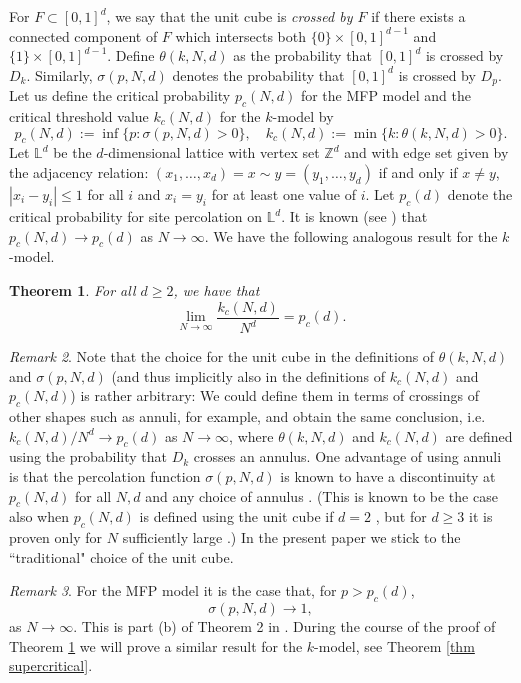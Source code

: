 \documentclass[11pt,a4paper]{article}
\newcommand{\IL}{\ensuremath{\mathbb{L}}}
\newcommand{\pc}{\ensuremath{p_{c}(d)}}
\newtheorem{theorem}{Theorem}[section]
\theoremstyle{remark}
\newtheorem{remark}[theorem]{Remark}
\begin{document}
For $F\subset [0,1]^d$, we say that the unit cube is \emph{crossed by $F$} if there exists a connected component of $F$ which intersects both $\{0\} \times [0,1]^{d-1}$ and $\{1\} \times [0,1]^{d-1}$. Define $\theta(k,N,d)$ as the probability that $[0,1]^d$ is crossed by $D_k$. Similarly, $\sigma(p,N,d)$ denotes the probability that $[0,1]^d$ is crossed by $D_{p}$. Let us define the critical probability $p_c(N,d)$ for the MFP model and the critical threshold value $k_c(N,d)$ for the $k$-model by
\[
 p_c(N,d) := \inf\{ p: \sigma(p,N,d) >0\}, \quad k_{c}(N,d) := \min \{k: \theta(k,N,d)>0\}.
\]
Let ${\mathbb L}^d$ be the $d$-dimensional lattice with
vertex set ${\mathbb Z}^d$ and with edge set given by the adjacency
relation: $(x_1, \ldots, x_d)=x \sim y=(y_1, \ldots, y_d)$
if and only if $x \neq y$, $|x_i-y_i| \leq 1$ for all $i$
and $x_i=y_i$ for at least one value of $i$. Let $p_c(d)$ denote the critical probability for site percolation on 
$\IL^d$. It is known (see \cite{FalGri}) that $p_{c}(N,d) \to p_c(d)$ as $N \to \infty$. We have the following analogous result for the $k$-model.


\begin{theorem}\label{thm critical k}
For all $d \geq 2$, we have that
 \[
 \lim_{N \to \infty} \frac{k_{c}(N,d)}{N^{d}} = p_{c}(d). 
 \]
\end{theorem}


\begin{remark} Note that the choice for the unit cube in the definitions of $\theta(k,N,d)$ and $\sigma(p,N,d)$ (and thus implicitly also in the definitions of $k_c(N,d)$ and $p_c(N,d)$) is rather arbitrary: We could define them in terms of crossings of other shapes such as annuli, for example, and obtain the same conclusion, i.e.\ $k_c(N,d)/N^d \to \pc$ as $N \to \infty$, where $\theta(k,N,d)$ and $k_c(N,d)$ are defined using the probability that $D_k$ crosses an annulus. One advantage of using annuli is that the percolation function $\sigma(p,N,d)$ is known to have a discontinuity at $p_c(N,d)$ for all $N,d$ and any choice of annulus \cite[Corollary 2.6]{BroCam}. (This is known to be the case also when $p_c(N,d)$ is defined using the unit cube if $d=2$ \cite{ChaChaDur, DekMee}, but for $d\geq 3$ it is proven only for $N$ sufficiently large \cite{BroCam08}.) In the present paper we stick to the ``traditional" choice of the unit cube.
\end{remark}


\begin{remark}\label{remark supercritical MFP}
For the MFP model it is the case  that, for $p>\pc$,
\begin{equation}\label{prob to 1}
\sigma(p,N,d) \to 1,  
\end{equation}
as $N \to \infty$. This is part (b) of Theorem 2 in \cite{FalGri}. During the course of the proof of Theorem \ref{thm critical k} we will prove a similar result for the $k$-model, see Theorem \ref{thm supercritical}.
\end{remark}
\end{document}
